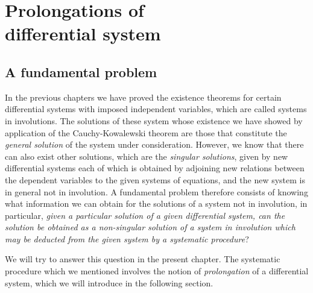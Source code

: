 \documentclass[leqno,11pt]{book}
\numberwithin{equation}{chapter}
\theoremstyle{shape1}
\theoremstyle{shape0}
\theoremstyle{shape2}
\theoremstyle{definition}
\begin{document}
\chapter[Prolongation of differential system]{Prolongations of\\differential system}
\label{cha:prol-diff-syst}

\section{A fundamental problem}
\label{sec:fundamental-problem}

\fsec In the previous chapters we have proved the existence theorems for certain differential systems with imposed independent variables, which are called systems in involutions. The solutions of these system whose existence we have showed by application of the Cauchy-Kowalewski theorem are those that constitute the \emph{general solution} of the system under consideration. However, we know that there can also exist other solutions, which are the \emph{singular solutions}, given by new differential systems each of which is obtained by adjoining new relations between the dependent variables to the given systems of equations, and the new system is in general not in involution. A fundamental problem therefore consists of knowing what information we can obtain for the solutions of a system not in involution, in particular, \emph{given a particular solution of a given differential system, can the solution be obtained as a non-singular solution of a system in involution which may be deducted from the given system by a systematic procedure}?

We will try to answer this question in the present chapter. The systematic procedure which we mentioned involves the notion of \emph{prolongation} of a differential system, which we will introduce in the following section.
\end{document}
